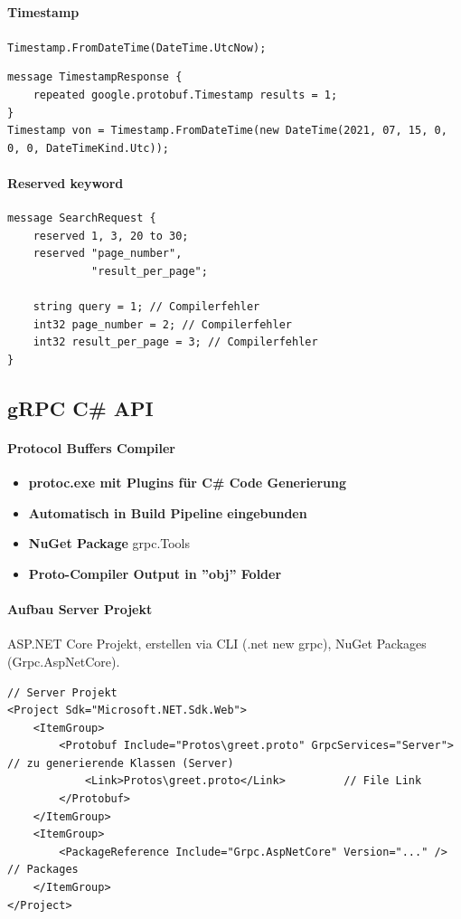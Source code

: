 \documentclass[
a4paper,
oneside,
10pt,
fleqn,
headsepline,
toc=listofnumbered, 
bibliography=totocnumbered]{scrartcl}
\begin{document}
\paragraph{Timestamp} \lstinline{Timestamp.FromDateTime(DateTime.UtcNow);}
\begin{lstlisting}
message TimestampResponse {
    repeated google.protobuf.Timestamp results = 1;
}
Timestamp von = Timestamp.FromDateTime(new DateTime(2021, 07, 15, 0, 0, 0, DateTimeKind.Utc));
\end{lstlisting}



\paragraph{Reserved keyword}
\begin{lstlisting}
message SearchRequest {
    reserved 1, 3, 20 to 30;
    reserved "page_number",
             "result_per_page";
             
    string query = 1; // Compilerfehler
    int32 page_number = 2; // Compilerfehler
    int32 result_per_page = 3; // Compilerfehler
}
\end{lstlisting}
\subsection{gRPC C\# API}
\paragraph{Protocol Buffers Compiler}
\begin{itemize}
    \item \textbf{protoc.exe mit Plugins für C\# Code Generierung}
    \item \textbf{Automatisch in Build Pipeline eingebunden}
    \item \textbf{NuGet Package} grpc.Tools
    \item \textbf{Proto-Compiler Output in ''obj'' Folder}
\end{itemize}

\paragraph{Aufbau Server Projekt} ASP.NET Core Projekt, erstellen via CLI (.net new grpc), NuGet Packages (Grpc.AspNetCore).
\begin{lstlisting}
// Server Projekt
<Project Sdk="Microsoft.NET.Sdk.Web">
    <ItemGroup>
        <Protobuf Include="Protos\greet.proto" GrpcServices="Server"> // zu generierende Klassen (Server)
            <Link>Protos\greet.proto</Link>         // File Link
        </Protobuf>
    </ItemGroup>
    <ItemGroup>
        <PackageReference Include="Grpc.AspNetCore" Version="..." />  // Packages
    </ItemGroup>
</Project>
\end{lstlisting}
\end{document}
